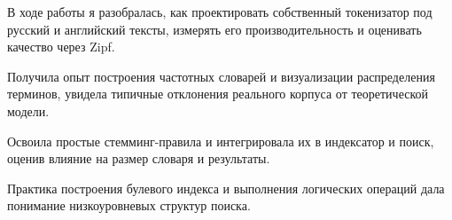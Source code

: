 \documentclass[12pt,a4paper]{article}
\begin{document}
В ходе работы я разобралась, как проектировать собственный токенизатор под русский и английский тексты, измерять его производительность и оценивать качество через Zipf.

Получила опыт построения частотных словарей и визуализации распределения терминов, увидела типичные отклонения реального корпуса от теоретической модели.

Освоила простые стемминг-правила и интегрировала их в индексатор и поиск, оценив влияние на размер словаря и результаты.

Практика построения булевого индекса и выполнения логических операций дала понимание низкоуровневых структур поиска.
\end{document}
